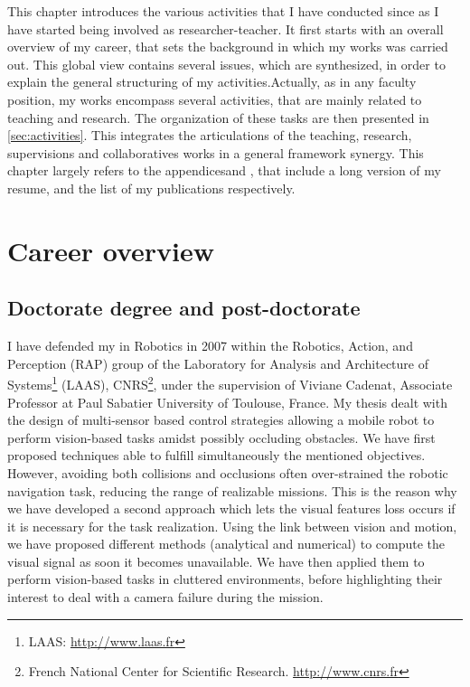 

This chapter introduces the various activities that I have conducted since as I have started being involved as researcher-teacher. 
It first starts with an overall overview of my career, that sets the background in which  my works was carried out.
This global  view contains several issues, which are synthesized, in order to explain the general structuring of my activities.Actually, as in any faculty position, my works encompass several activities, that are mainly related to teaching and research.
The organization of these tasks are then presented in \autoref{sec:activities}.
This integrates the articulations of the teaching, research, supervisions and collaboratives works in a general framework synergy.
This chapter largely refers to the appendices\;\RefCV and \RefMyRef, that include a long version of my resume, and the list of my publications respectively.


\section{Career overview}\label{sec:career}

\subsection{Doctorate degree and post-doctorate}\label{sec:career:PhD}

I have defended my \PhD in Robotics in 2007 within the  Robotics, Action, and Perception (RAP) group of the Laboratory for Analysis and Architecture of Systems\footnote{LAAS: \url{http://www.laas.fr}} (LAAS), CNRS\footnote{French National Center for Scientific Research. \url{http://www.cnrs.fr}}, under the supervision of Viviane Cadenat, Associate Professor at Paul Sabatier University of Toulouse, France. 
My \PhD thesis dealt with the design of multi-sensor based control strategies allowing a mobile robot to perform vision-based tasks amidst possibly occluding obstacles.
We have first proposed techniques able to fulfill simultaneously the mentioned objectives. 
However, avoiding both collisions and occlusions often over-strained the robotic navigation task, reducing the range of realizable missions. 
This is the reason why we have developed a second approach which lets the visual features loss occurs if it is necessary for the task realization. 
Using the link between vision and motion, we have proposed different methods (analytical and numerical) to compute the visual signal as soon it becomes unavailable. 
We have then applied them to perform vision-based tasks in cluttered environments, before highlighting their interest to deal with a camera failure during the mission.

